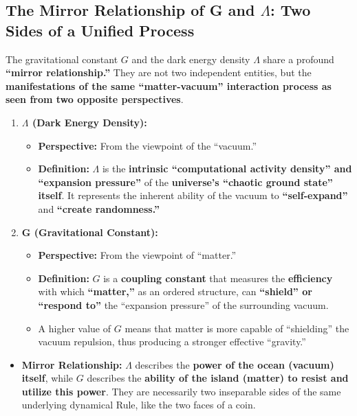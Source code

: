 \documentclass[11pt, a4paper]{article}
\begin{document}
\subsection{The Mirror Relationship of G and $\Lambda$: Two Sides of a Unified Process}

The gravitational constant $G$ \cite{Newton1687} and the dark energy density $\Lambda$ \cite{Planck2020} share a profound \textbf{``mirror relationship.''} They are not two independent entities, but the \textbf{manifestations of the same ``matter-vacuum'' interaction process as seen from two opposite perspectives}.

\begin{enumerate}
    \item \textbf{$\Lambda$ (Dark Energy Density):}
    \begin{itemize}
        \item \textbf{Perspective:} From the viewpoint of the ``vacuum.''
        \item \textbf{Definition:} $\Lambda$ is the \textbf{intrinsic ``computational activity density'' and ``expansion pressure''} of the \textbf{universe's ``chaotic ground state'' itself}. It represents the inherent ability of the vacuum to \textbf{``self-expand''} and \textbf{``create randomness.''}
    \end{itemize}

    \item \textbf{G (Gravitational Constant):}
    \begin{itemize}
        \item \textbf{Perspective:} From the viewpoint of ``matter.''
        \item \textbf{Definition:} $G$ is a \textbf{coupling constant} that measures the \textbf{efficiency} with which \textbf{``matter,''} as an ordered structure, can \textbf{``shield'' or ``respond to''} the ``expansion pressure'' of the surrounding vacuum.
        \item A higher value of $G$ means that matter is more capable of ``shielding'' the vacuum repulsion, thus producing a stronger effective ``gravity.''
    \end{itemize}
\end{enumerate}

\begin{itemize}
    \item \textbf{Mirror Relationship:} $\Lambda$ describes the \textbf{power of the ocean (vacuum) itself}, while $G$ describes the \textbf{ability of the island (matter) to resist and utilize this power}. They are necessarily two inseparable sides of the same underlying dynamical Rule, like the two faces of a coin.
\end{itemize}
\end{document}
